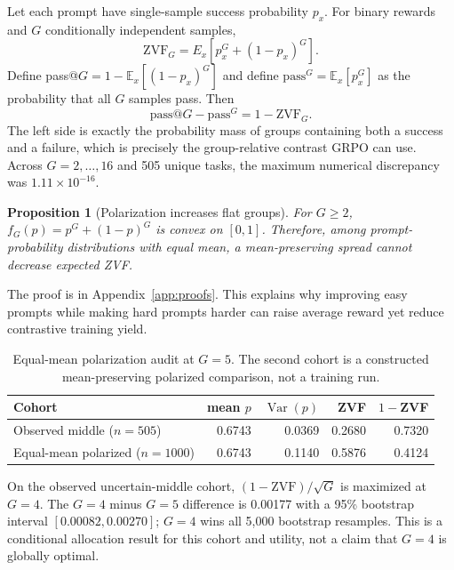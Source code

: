 \documentclass{article}
\newtheorem{proposition}{Proposition}
\newcommand{\E}{\mathbb{E}}
\begin{document}
Let each prompt have single-sample success probability $p_x$.  For binary
rewards and $G$ conditionally independent samples,
\begin{equation}
  \mathrm{ZVF}_G=E_x[p_x^G+(1-p_x)^G].
  \label{eq:zvf}
\end{equation}
Define pass@$G=1-\E_x[(1-p_x)^G]$ and define
$\mathrm{pass}^{G}=\E_x[p_x^G]$ as the probability that all $G$ samples pass.
Then
\begin{equation}
  \mathrm{pass@}G-\mathrm{pass}^{G}=1-\mathrm{ZVF}_G.
  \label{eq:duality}
\end{equation}
The left side is exactly the probability mass of groups containing both a
success and a failure, which is precisely the group-relative contrast GRPO
can use.  Across $G=2,\ldots,16$ and 505 unique tasks, the maximum numerical
discrepancy was $1.11\times10^{-16}$.

\begin{proposition}[Polarization increases flat groups]
For $G\geq2$, $f_G(p)=p^G+(1-p)^G$ is convex on $[0,1]$.  Therefore, among
prompt-probability distributions with equal mean, a mean-preserving spread
cannot decrease expected ZVF.
\end{proposition}
The proof is in Appendix~\ref{app:proofs}.  This explains why improving easy
prompts while making hard prompts harder can raise average reward yet reduce
contrastive training yield.

\begin{table}[t]
\centering
\caption{Equal-mean polarization audit at $G=5$.  The second cohort is a
constructed mean-preserving polarized comparison, not a training run.}
\label{tab:polarization}
\small
\begin{tabular}{@{}lrrrr@{}}
\toprule
Cohort & mean $p$ & $\operatorname{Var}(p)$ & ZVF & $1-$ZVF \\
\midrule
Observed middle ($n=505$) & 0.6743 & 0.0369 & 0.2680 & 0.7320 \\
Equal-mean polarized ($n=1000$) & 0.6743 & 0.1140 & 0.5876 & 0.4124 \\
\bottomrule
\end{tabular}
\end{table}

On the observed uncertain-middle cohort, $(1-\mathrm{ZVF})/\sqrt{G}$ is
maximized at $G=4$.  The $G=4$ minus $G=5$ difference is 0.00177 with a
95\% bootstrap interval $[0.00082,0.00270]$; $G=4$ wins all 5,000 bootstrap
resamples.  This is a conditional allocation result for this cohort and
utility, not a claim that $G=4$ is globally optimal.
\end{document}
